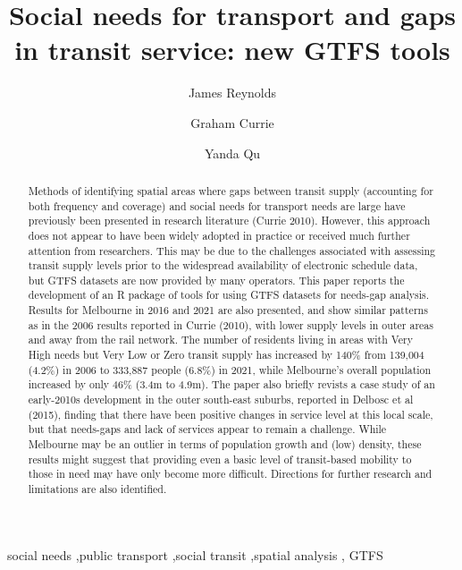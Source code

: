 \documentclass[preprint, 3p,
authoryear]{elsarticle} %
\begin{document}
\begin{frontmatter}

  \title{Social needs for transport and gaps in transit service: new
GTFS tools}
    \author[Public Transport Research Group (PTRG)]{James Reynolds%
  }
    \author[Public Transport Research Group (PTRG)]{Graham Currie%
  }
    \author[Public Transport Research Group (PTRG)]{Yanda Qu%
  }
  
  \begin{abstract}
  Methods of identifying spatial areas where gaps between transit supply
  (accounting for both frequency and coverage) and social needs for
  transport needs are large have previously been presented in research
  literature (Currie 2010). However, this approach does not appear to
  have been widely adopted in practice or received much further
  attention from researchers. This may be due to the challenges
  associated with assessing transit supply levels prior to the
  widespread availability of electronic schedule data, but GTFS datasets
  are now provided by many operators. This paper reports the development
  of an R package of tools for using GTFS datasets for needs-gap
  analysis. Results for Melbourne in 2016 and 2021 are also presented,
  and show similar patterns as in the 2006 results reported in Currie
  (2010), with lower supply levels in outer areas and away from the rail
  network. The number of residents living in areas with Very High needs
  but Very Low or Zero transit supply has increased by 140\% from
  139,004 (4.2\%) in 2006 to 333,887 people (6.8\%) in 2021, while
  Melbourne's overall population increased by only 46\% (3.4m to 4.9m).
  The paper also briefly revists a case study of an early-2010s
  development in the outer south-east suburbs, reported in Delbosc et al
  (2015), finding that there have been positive changes in service level
  at this local scale, but that needs-gaps and lack of services appear
  to remain a challenge. While Melbourne may be an outlier in terms of
  population growth and (low) density, these results might suggest that
  providing even a basic level of transit-based mobility to those in
  need may have only become more difficult. Directions for further
  research and limitations are also identified.
  \end{abstract}
    \begin{keyword}
    social needs \sep public transport \sep social transit \sep spatial
analysis \sep 
    GTFS
  \end{keyword}
  
 \end{frontmatter}
\end{document}
